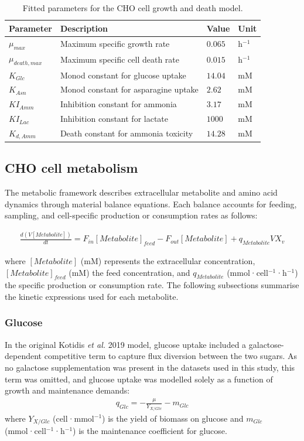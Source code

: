 \begin{table}[h!]
\centering
\renewcommand{\arraystretch}{1.3}
\setlength{\tabcolsep}{10pt}
\small
\caption{Fitted parameters for the CHO cell growth and death model.}
\begin{tabular}{llll}
\hline
\textbf{Parameter} & \textbf{Description} & \textbf{Value} & \textbf{Unit} \\
\hline
$\mu_{max}$ & Maximum specific growth rate & $0.065$ & h$^{-1}$ \\
$\mu_{death,max}$ & Maximum specific cell death rate & $0.015$ & h$^{-1}$ \\
$K_{Glc}$ & Monod constant for glucose uptake & $14.04$ & mM \\
$K_{Asn}$ & Monod constant for asparagine uptake & $2.62$ & mM \\
$KI_{Amm}$ & Inhibition constant for ammonia & $3.17$ & mM \\
$KI_{Lac}$ & Inhibition constant for lactate & $1000$ & mM \\
$K_{d,Amm}$ & Death constant for ammonia toxicity & $14.28$ & mM \\
\hline
\end{tabular}

\end{table}


\subsection*{CHO cell metabolism}

The metabolic framework describes extracellular metabolite and amino acid dynamics through material balance equations. Each balance accounts for feeding, sampling, and cell-specific production or consumption rates as follows:

\begin{align}
\frac{d(V[Metabolite])}{dt} = F_{in}[Metabolite]_{feed} - F_{out}[Metabolite] + q_{Metabolite}V X_v
\end{align}

\noindent where $[Metabolite]$ (mM) represents the extracellular concentration, $[Metabolite]_{feed}$ (mM) the feed concentration, and $q_{Metabolite}$ (mmol·cell$^{-1}$·h$^{-1}$) the specific production or consumption rate. The following subsections summarise the kinetic expressions used for each metabolite.

\subsubsection*{Glucose}
In the original Kotidis \textit{et al.} 2019 model, glucose uptake included a galactose-dependent competitive term to capture flux diversion between the two sugars. As no galactose supplementation was present in the datasets used in this study, this term was omitted, and glucose uptake was modelled solely as a function of growth and maintenance demands:
\begin{align}
q_{Glc} = -\frac{\mu}{Y_{X/Glc}} - m_{Glc}
\end{align}
\noindent where $Y_{X/Glc}$ (cell·mmol$^{-1}$) is the yield of biomass on glucose and $m_{Glc}$ (mmol·cell$^{-1}$·h$^{-1}$) is the maintenance coefficient for glucose.

